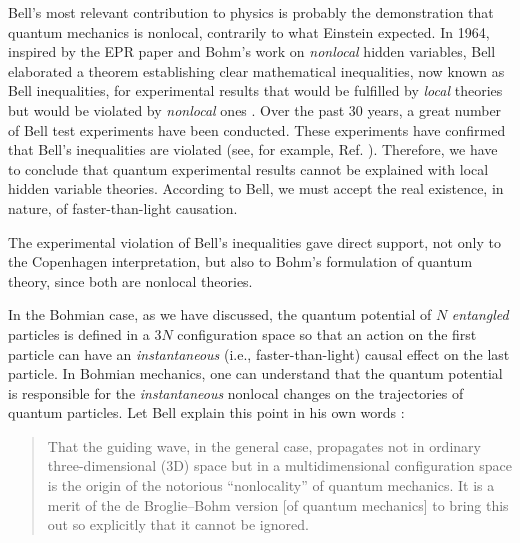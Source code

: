 \documentclass[onecolumn,nofootinbib, secnumarabic, amsmath, nobibnotes,12pt,aps,pra]{revtex4-1}
\begin{document}
Bell's most relevant contribution to physics is probably the
demonstration that quantum mechanics is nonlocal, contrarily to what
Einstein expected. In 1964, inspired by the EPR paper
\cite{om.Einstein_rosen1935} and Bohm's work on \textit{nonlocal}
hidden variables, Bell elaborated a theorem establishing clear
mathematical inequalities, now known as Bell inequalities, for
experimental results that would be fulfilled by \textit{local}
theories but would be violated by \textit{nonlocal} ones
\cite{om.Bell1964}. Over the past 30 years, a great number of Bell
test experiments have been conducted. These experiments have
confirmed that Bell's inequalities are violated (see, for example,
Ref. \cite{om.aspect1982}). Therefore, we have to conclude that
quantum experimental results cannot be explained with local hidden
variable theories. According to Bell, we must accept the real
existence, in nature, of faster-than-light causation.

The experimental violation of Bell's inequalities gave direct support, not only to the Copenhagen interpretation, but also to Bohm's formulation of quantum theory, since both are nonlocal theories.

In the Bohmian case, as we have discussed, the quantum potential of $N$ \textit{entangled} particles is defined in a $3N$ configuration space so that an action on the first particle can have an \textit{instantaneous} (i.e., faster-than-light) causal effect on the last particle. In Bohmian mechanics, one can understand that the quantum potential is responsible for the \textit{instantaneous} nonlocal changes on the trajectories of quantum particles.
Let Bell explain this point in his own words \cite{om.Bell1987}:\vspace*{-6pt}\\
\begin{quote}
That the guiding wave, in the general case, propagates not in
ordinary three-dimensional (3D) space but in a multidimensional
configuration space is the origin of the notorious ``nonlocality''
of quantum mechanics. It is a merit of the de Broglie--Bohm version
[of quantum mechanics] to bring this out so explicitly that it
cannot be ignored.\vspace*{-6pt}\\
\end{quote}
\end{document}
